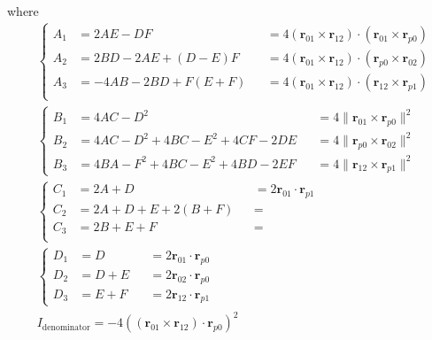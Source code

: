 \documentclass[main.tex]{subfiles}
\begin{document}
where
\begin{equation}
\begin{aligned}
&\left\{
\begin{aligned}
A_1 &= 2AE-DF &&= 4 (\bm{r}_{01}\times\bm{r}_{12}) \cdot (\bm{r}_{01}\times\bm{r}_{p0})\\
A_2 &= 2BD-2AE+(D-E)F &&= 4 (\bm{r}_{01}\times\bm{r}_{12}) \cdot (\bm{r}_{p0}\times\bm{r}_{02})\\
A_3 &= -4AB-2BD+F(E+F) &&= 4 (\bm{r}_{01}\times\bm{r}_{12}) \cdot (\bm{r}_{12}\times\bm{r}_{p1})\\
\end{aligned}
\right.\\
&\left\{
\begin{aligned}
B_1 &= 4AC-D^2 &&= 4 \|\bm{r}_{01}\times\bm{r}_{p0}\|^2\\
B_2 &= 4AC-D^2+4BC-E^2+4CF-2DE &&= 4 \|\bm{r}_{p0}\times\bm{r}_{02}\|^2\\
B_3 &= 4BA-F^2+4BC-E^2+4BD-2EF &&= 4 \|\bm{r}_{12}\times\bm{r}_{p1}\|^2
\end{aligned}
\right.\\
&\left\{
\begin{aligned}
C_1 &= 2A+D &&= 2\bm{r}_{01}\cdot\bm{r}_{p1}\\
C_2 &= 2A+D+E+2(B+F) &&=\\
C_3 &= 2B+E+F &&=\\
\end{aligned}
\right.\\
&\left\{
\begin{aligned}
D_1 &= D &&= 2\bm{r}_{01}\cdot\bm{r}_{p0}\\
D_2 &= D+E &&= 2\bm{r}_{02}\cdot\bm{r}_{p0}\\
D_3 &= E+F &&= 2\bm{r}_{12}\cdot\bm{r}_{p1}
\end{aligned}
\right.\\
&I_\text{denominator} = -4 \left( (\bm{r}_{01}\times\bm{r}_{12}) \cdot \bm{r}_{p0} \right)^2\\
\end{aligned}
\end{equation}
\end{document}
